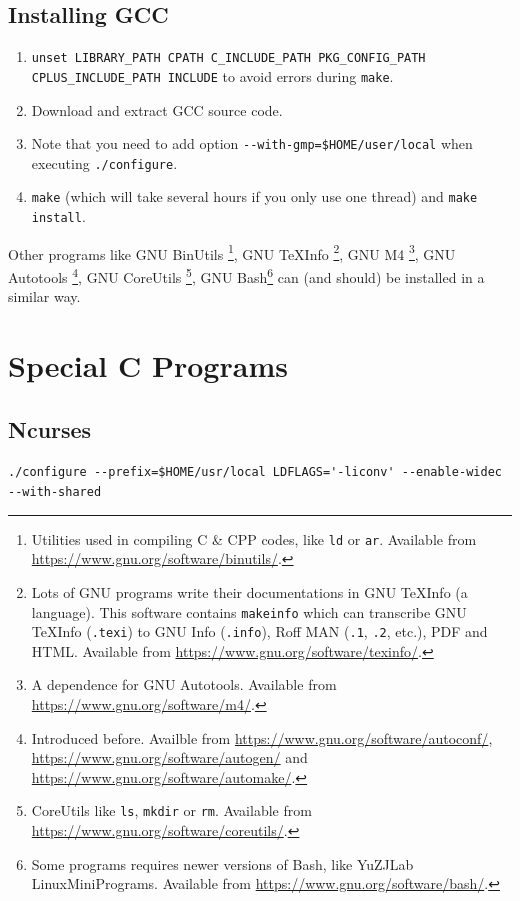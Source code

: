 \documentclass[]{article}
\begin{document}
\subsection{Installing GCC}
\begin{enumerate}
\item \verb|unset LIBRARY_PATH CPATH C_INCLUDE_PATH PKG_CONFIG_PATH CPLUS_INCLUDE_PATH INCLUDE| to avoid errors during \verb|make|.

\item Download and extract GCC source code.

\item Note that you need to add option \verb|--with-gmp=$HOME/user/local| when executing \verb|./configure|.

\item \verb|make| (which will take several hours if you only use one thread) and \verb|make install|.
\end{enumerate}

Other programs like GNU BinUtils \footnote{Utilities used in compiling C \& CPP codes, like {\tt ld} or {\tt ar}. Available from \url{https://www.gnu.org/software/binutils/}.}, GNU TeXInfo \footnote{Lots of GNU programs write their documentations in GNU TeXInfo (a language). This software contains {\tt makeinfo} which can transcribe GNU TeXInfo ({\tt .texi}) to GNU Info ({\tt .info}), Roff MAN ({\tt .1}, {\tt .2}, etc.), PDF and HTML. Available from \url{https://www.gnu.org/software/texinfo/}.}, GNU M4 \footnote{A dependence for GNU Autotools. Available from \url{https://www.gnu.org/software/m4/}.}, GNU Autotools \footnote{Introduced before. Availble from \url{https://www.gnu.org/software/autoconf/}, \url{https://www.gnu.org/software/autogen/} and \url{https://www.gnu.org/software/automake/}.}, GNU CoreUtils \footnote{CoreUtils like {\tt ls}, {\tt mkdir} or {\tt rm}. Available from \url{https://www.gnu.org/software/coreutils/}.}, GNU Bash\footnote{Some programs requires newer versions of Bash, like YuZJLab LinuxMiniPrograms. Available from \url{https://www.gnu.org/software/bash/}.} can (and should) be installed in a similar way.

\section{Special C Programs}

\subsection{Ncurses}
\verb|./configure --prefix=$HOME/usr/local LDFLAGS='-liconv' --enable-widec --with-shared|
\end{document}
